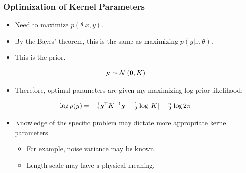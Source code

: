 \begin{frame} \frametitle{Optimization of Kernel Parameters}
\begin{itemize}
  \item Need to maximize $p(\theta|x,y)$.
  \item By the Bayes' theorem, this is the same as maximizing $p(y|x,\theta)$.
  \item This is the prior.
\end{itemize}
\begin{equation}
  \mathbf{y} \sim \mathcal{N}\left(\mathbf{0},K\right)
\end{equation}
\begin{itemize}
  \item Therefore, optimal parameters are given my maximizing log prior
    likelihood:
\end{itemize}
\begin{equation}
  \log p(y) = - \tfrac{1}{2}\mathbf{y}^{\mkern-1.5mu\mathsf{T}} K^{-1}\mathbf{y}
              - \tfrac{1}{2}\log|K| - \tfrac{n}{2}\log 2\pi
\end{equation}
\begin{itemize}
  \item Knowledge of the specific problem may dictate more appropriate kernel
    parameters.
  \begin{itemize}
    \item For example, noise variance may be known.
    \item Length scale may have a physical meaning.
  \end{itemize}
\end{itemize}
\end{frame}


\newcommand{\R}[2]{\item #1 \\ {\scriptsize\url{#2}}}
\newcommand{\arxiv}[1]{arXiv:\href{https://arxiv.org/abs/#1}{#1}}


